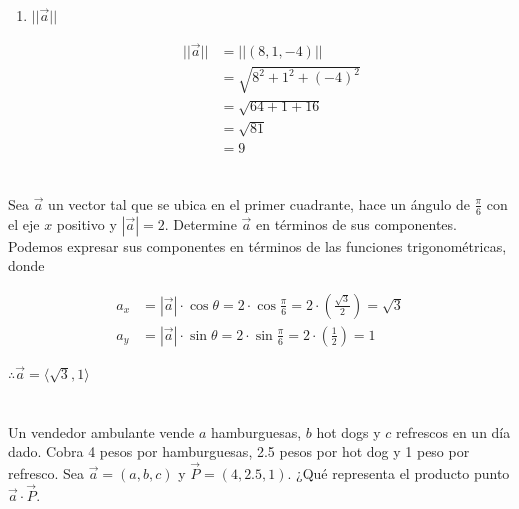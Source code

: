 \documentclass[12pt]{article}
\begin{document}
\begin{enumerate}[format=\textbf]
\item $||\vec{a}||$
  
  \begin{equation*}
    \begin{split}
      ||\vec{a}|| &= ||(8, 1, -4)|| \\
      &= \sqrt{8^2 + 1^2 + (-4)^2} \\
      &= \sqrt{64 + 1 + 16} \\
      &= \sqrt{81} \\
      &= 9
    \end{split}
  \end{equation*}
  
\end{enumerate}

\section{}

Sea $\vec{a}$ un vector tal que se ubica en el primer cuadrante, hace un ángulo de $\frac{\pi}{6}$ con el eje $x$ positivo  y $|\vec{a}|=2$. Determine $\vec{a}$ en términos de sus componentes. \\

Podemos expresar sus componentes en términos de las funciones trigonométricas, donde

\begin{align*}
  a_x​
  &= |\vec{a}| \cdot \cos{\theta} 
  = 2 \cdot \cos{\frac{\pi}{6}} 
  = 2 \cdot \left( \frac{\sqrt{3}}{2} \right) 
  = \sqrt{3} \\
  a_y
  &= |\vec{a}| \cdot \sin{\theta} 
  = 2 \cdot \sin{\frac{\pi}{6}} 
  = 2 \cdot \left( \frac{1}{2} \right) 
  = 1 
\end{align*}

$\therefore \vec{a} = \langle \sqrt{3}, 1 \rangle$

\section{}

Un vendedor ambulante vende $a$ hamburguesas, $b$ hot dogs y $c$ refrescos en un día dado. Cobra 4 pesos por hamburguesas, 2.5 pesos por hot dog y 1 peso por refresco. Sea $\vec{a}=(a,b,c)$ y $\vec{P}=(4,2.5,1)$. ¿Qué representa el producto punto $\vec{a} \cdot \vec{P}$. \\
\end{document}
